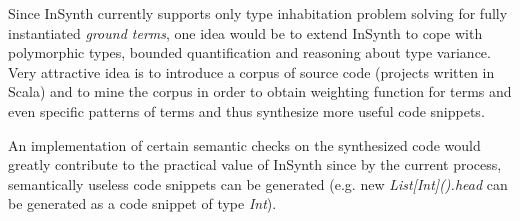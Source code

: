 Since InSynth currently supports only type inhabitation problem solving for fully instantiated \textit{ground terms}, one idea would be to extend InSynth to cope with polymorphic types, bounded quantification and reasoning about type variance. 
Very attractive idea is to introduce a corpus of source code (projects written in Scala) and to mine the corpus in order to obtain weighting function for terms and even specific patterns of terms and thus synthesize more useful code snippets.

An implementation of certain semantic checks on the synthesized code would greatly contribute to the practical value of InSynth since by the current process, semantically useless code snippets can be generated (e.g. new \textit{List[Int]().head} can be generated as a code snippet of type \textit{Int}).

